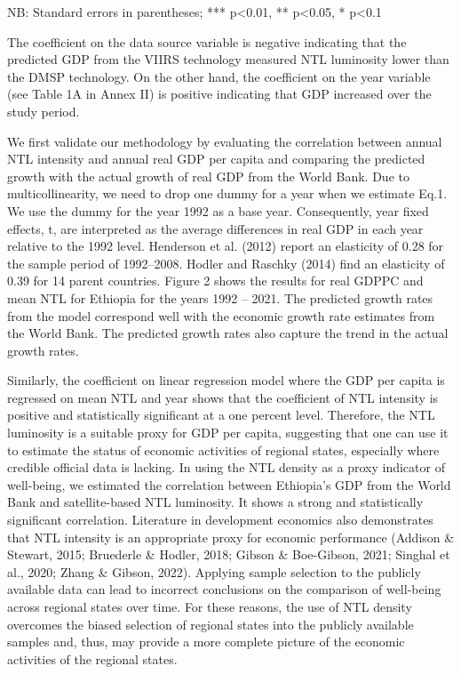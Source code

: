 NB: Standard errors in parentheses; *** p\textless0.01, **
p\textless0.05, * p\textless0.1

The coefficient on the data source variable is negative indicating that
the predicted GDP from the VIIRS technology measured NTL luminosity
lower than the DMSP technology. On the other hand, the coefficient on
the year variable (see Table 1A in Annex II) is positive indicating that
GDP increased over the study period.

We first validate our methodology by evaluating the correlation between
annual NTL intensity and annual real GDP per capita and comparing the
predicted growth with the actual growth of real GDP from the World Bank.
Due to multicollinearity, we need to drop one dummy for a year when we
estimate Eq.1. We use the dummy for the year 1992 as a base year.
Consequently, year fixed effects, t, are interpreted as the average
differences in real GDP in each year relative to the 1992 level.
Henderson et al. (2012) report an elasticity of 0.28 for the sample
period of 1992--2008. Hodler and Raschky (2014) find an elasticity of
0.39 for 14 parent countries. Figure 2 shows the results for real GDPPC
and mean NTL for Ethiopia for the years 1992 -- 2021. The predicted
growth rates from the model correspond well with the economic growth
rate estimates from the World Bank. The predicted growth rates also
capture the trend in the actual growth rates.

Similarly, the coefficient on linear regression model where the GDP per
capita is regressed on mean NTL and year shows that the coefficient of
NTL intensity is positive and statistically significant at a one percent
level. Therefore, the NTL luminosity is a suitable proxy for GDP per
capita, suggesting that one can use it to estimate the status of
economic activities of regional states, especially where credible
official data is lacking. In using the NTL density as a proxy indicator
of well-being, we estimated the correlation between Ethiopia's GDP from
the World Bank and satellite-based NTL luminosity. It shows a strong and
statistically significant correlation. Literature in development
economics also demonstrates that NTL intensity is an appropriate proxy
for economic performance (Addison \& Stewart, 2015; Bruederle \& Hodler,
2018; Gibson \& Boe-Gibson, 2021; Singhal et al., 2020; Zhang \& Gibson,
2022). Applying sample selection to the publicly available data can lead
to incorrect conclusions on the comparison of well-being across regional
states over time. For these reasons, the use of NTL density overcomes
the biased selection of regional states into the publicly available
samples and, thus, may provide a more complete picture of the economic
activities of the regional states.

